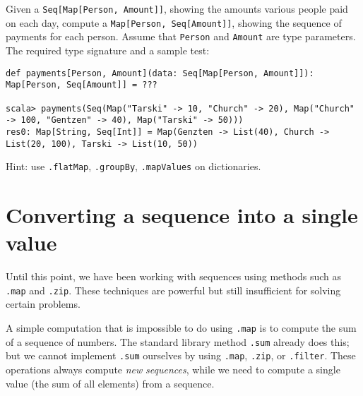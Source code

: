 Given a \lstinline!Seq[Map[Person, Amount]]!,
showing the amounts various people paid on each day, compute a \lstinline!Map[Person, Seq[Amount]]!,
showing the sequence of payments for each person. Assume that \lstinline!Person!
and \lstinline!Amount!
are type parameters. The required type signature and a sample test:
\begin{lstlisting}
def payments[Person, Amount](data: Seq[Map[Person, Amount]]): Map[Person, Seq[Amount]] = ???

scala> payments(Seq(Map("Tarski" -> 10, "Church" -> 20), Map("Church" -> 100, "Gentzen" -> 40), Map("Tarski" -> 50)))
res0: Map[String, Seq[Int]] = Map(Genzten -> List(40), Church -> List(20, 100), Tarski -> List(10, 50))
\end{lstlisting}
Hint: use \lstinline!.flatMap!,
\lstinline!.groupBy!, \lstinline!.mapValues!
on dictionaries.%
\begin{comment}
Solution:\inputencoding{latin9}
\begin{lstlisting}
def payments[Person, Amount](data: Seq[Map[Person, Amount]]): Map[Person, Seq[Amount]] = data.flatMap(_.toSeq).groupBy(_._1).mapValues(_.map(_._2))
\end{lstlisting}
\inputencoding{utf8}\end{comment}


\section{Converting a sequence into a single value}

Until this point, we have been working with sequences using methods
such as \lstinline!.map!
and \lstinline!.zip!. These
techniques are powerful but still insufficient for solving certain
problems.

A simple computation that is impossible to do using \lstinline!.map!
is to compute the sum of a sequence of numbers. The standard library
method \lstinline!.sum!
already does this; but we cannot implement \lstinline!.sum!
ourselves by using \lstinline!.map!,
\lstinline!.zip!, or \lstinline!.filter!.
These operations always compute \emph{new} \emph{sequences}, while
we need to compute a single value (the sum of all elements) from a
sequence. 

